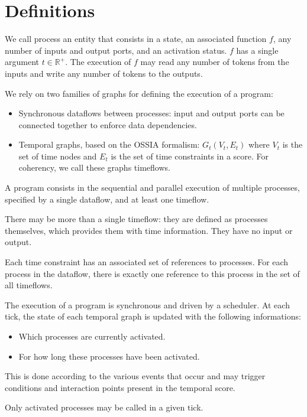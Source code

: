 \documentclass{article}
\begin{document}
\section{Definitions}
We call process an entity that consists in a state, an associated function $f$, any number of inputs and output ports, and an activation status.
$f$ has a single argument $t \in \mathbb{R^+}$.
The execution of $f$ may read any number of tokens from the inputs and write any number of tokens to the outputs.
    
We rely on two families of graphs for defining the execution of a program:
    
\begin{itemize}
  \item Synchronous dataflows between processes: input and output ports can be connected together to enforce data dependencies.
  \item Temporal graphs, based on the OSSIA formalism: $G_t(V_t, E_t)$ where $V_t$ is the set of time nodes and $E_t$ is the set of time constraints in a score. 
  For coherency, we call these graphs timeflows.
\end{itemize}

A program consists in the sequential and parallel execution of multiple processes, specified by a single dataflow, and at least one timeflow.
    
There may be more than a single timeflow: they are defined as processes themselves, which provides them with time information.
They have no input or output.
    
Each time constraint has an associated set of references to processes.
For each process in the dataflow, there is exactly one reference to this process in the set of all timeflows.
    
The execution of a program is synchronous and driven by a scheduler.
At each tick, the state of each temporal graph is updated with the following informations:
    
\begin{itemize}
  \item Which processes are currently activated.
  \item For how long these processes have been activated.
\end{itemize}

This is done according to the various events that occur and may trigger conditions and interaction points present in the temporal score.
    
Only activated processes may be called in a given tick.
    
\end{document}
